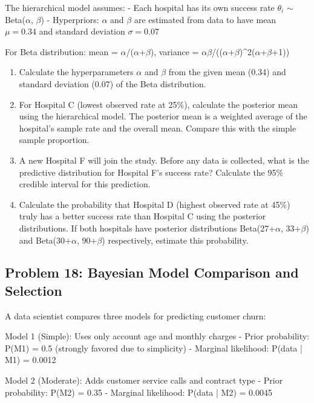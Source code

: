 \documentclass[12pt]{article}
\begin{document}
The hierarchical model assumes:
- Each hospital has its own success rate \(\theta_i\) \(\sim\) Beta(\(\alpha\), \(\beta\))
- Hyperpriors: \(\alpha\) and \(\beta\) are estimated from data to have mean \(\mu = 0.34\) and standard deviation \(\sigma = 0.07\)

For Beta distribution: mean = \(\alpha\)/(\(\alpha\)+\(\beta\)), variance = \(\alpha\beta\)/((\(\alpha\)+\(\beta\))^2(\(\alpha\)+\(\beta\)+1))

\begin{enumerate}[label=(\alph*)]
\item Calculate the hyperparameters \(\alpha\) and \(\beta\) from the given mean (0.34) and standard deviation (0.07) of the Beta distribution.

\item For Hospital C (lowest observed rate at 25\%), calculate the posterior mean using the hierarchical model. The posterior mean is a weighted average of the hospital's sample rate and the overall mean. Compare this with the simple sample proportion.

\item A new Hospital F will join the study. Before any data is collected, what is the predictive distribution for Hospital F's success rate? Calculate the 95\% credible interval for this prediction.

\item Calculate the probability that Hospital D (highest observed rate at 45\%) truly has a better success rate than Hospital C using the posterior distributions. If both hospitals have posterior distributions Beta(27+\(\alpha\), 33+\(\beta\)) and Beta(30+\(\alpha\), 90+\(\beta\)) respectively, estimate this probability.
\end{enumerate}

\subsection*{Problem 18: Bayesian Model Comparison and Selection}

A data scientist compares three models for predicting customer churn:

Model 1 (Simple): Uses only account age and monthly charges
- Prior probability: P(M1) = 0.5 (strongly favored due to simplicity)
- Marginal likelihood: P(data | M1) = 0.0012

Model 2 (Moderate): Adds customer service calls and contract type
- Prior probability: P(M2) = 0.35
- Marginal likelihood: P(data | M2) = 0.0045
\end{document}
